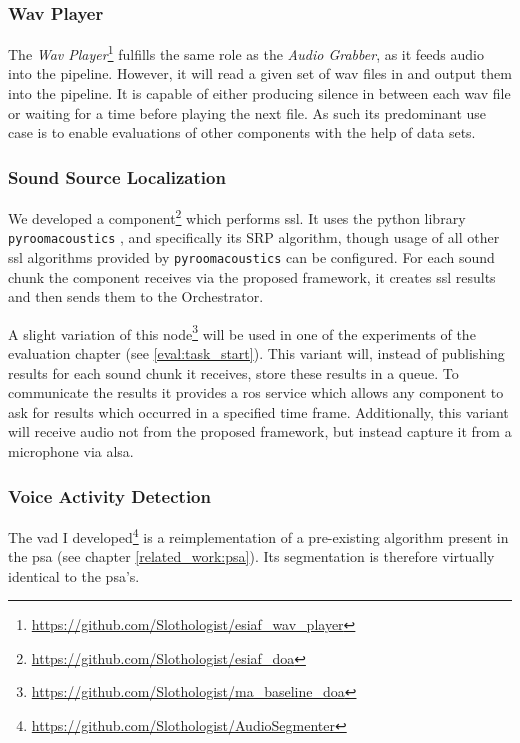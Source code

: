 \subsubsection{Wav Player}
\label{main:components:wav}
The \textit{Wav Player}\footnote{\url{https://github.com/Slothologist/esiaf_wav_player}} fulfills the same role as the \textit{Audio Grabber}, as it feeds audio into the pipeline.
However, it will read a given set of wav files in and output them into the pipeline.
It is capable of either producing silence in between each wav file or waiting for a time before playing the next file.
As such its predominant use case is to enable evaluations of other components with the help of data sets.

\subsubsection{Sound Source Localization}
\label{main:components:ssl}
We developed a component\footnote{\url{https://github.com/Slothologist/esiaf_doa}} which performs \gls{ssl}.
It uses the python library \texttt{pyroomacoustics} \cite{pyroomacoustics}, and specifically its SRP algorithm, though usage of all other \gls{ssl} algorithms provided by \texttt{pyroomacoustics} can be configured.
For each sound chunk the component receives via the proposed framework, it creates \gls{ssl} results and then sends them to the Orchestrator.

A slight variation of this node\footnote{\url{https://github.com/Slothologist/ma_baseline_doa}}  will be used in one of the experiments of the evaluation chapter (see \ref{eval:task_start}).
This variant will, instead of publishing results for each sound chunk it receives, store these results in a queue.
To communicate the results it provides a \gls{ros} service which allows any component to ask for results which occurred in a specified time frame.
Additionally, this variant will receive audio not from the proposed framework, but instead capture it from a microphone via \gls{alsa}.

\subsubsection{Voice Activity Detection}
\label{main:components:vad}
The \gls{vad} I developed\footnote{\url{https://github.com/Slothologist/AudioSegmenter}} is a reimplementation of a pre-existing algorithm present in the \gls{psa} (see chapter \ref{related_work:psa}).
Its segmentation is therefore virtually identical to the \gls{psa}'s.

